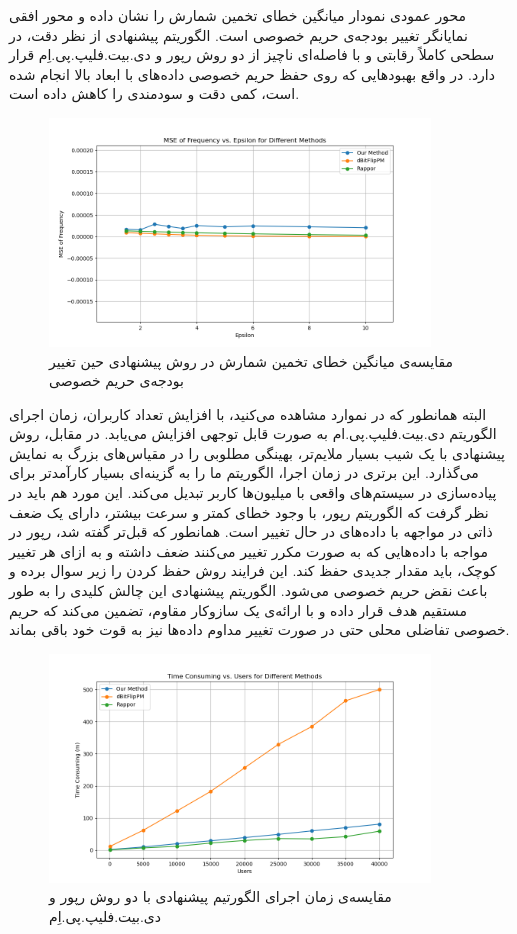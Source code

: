 
محور عمودی نمودار  میانگین خطای تخمین شمارش را نشان داده و محور افقی نمایانگر تغییر بودجه‌ی حریم خصوصی است. الگوریتم پیشنهادی از نظر دقت، در سطحی کاملاً رقابتی و با فاصله‌ای ناچیز از دو روش رپور و دی.بیت.فلیپ.پی.اِم قرار دارد. در واقع بهبودهایی که روی حفظ حریم خصوصی داده‌های با ابعاد بالا انجام شده است، کمی دقت و سودمندی را کاهش داده است.

\begin{figure}[h]
  \centering
  \includegraphics[width=0.9\textwidth]{figs/evaluation_eps_frq.png}
  \caption{مقایسه‌ی میانگین خطای تخمین شمارش در روش پیشنهادی حین تغییر بودجه‌ی حریم خصوصی}
  \label{fig:eps_frq}
\end{figure}

البته همانطور که در نموارد  مشاهده می‌کنید، با افزایش تعداد کاربران، زمان اجرای الگوریتم دی.بیت.فلیپ.پی.ام به صورت قابل توجهی افزایش می‌یابد. در مقابل، روش پیشنهادی با یک شیب بسیار ملایم‌تر، بهینگی مطلوبی را در مقیاس‌های بزرگ به نمایش می‌گذارد. این برتری در زمان اجرا، الگوریتم ما را به گزینه‌ای بسیار کارآمدتر برای پیاده‌سازی در سیستم‌های واقعی با میلیون‌ها کاربر تبدیل می‌کند. این مورد هم باید در نظر گرفت که الگوریتم رپور، با وجود خطای کمتر و سرعت بیشتر، دارای یک ضعف ذاتی در مواجهه با داده‌های در حال تغییر است. همانطور که قبل‌تر گفته شد، رپور در مواجه با داده‌هایی که به صورت مکرر تغییر می‌کنند ضعف داشته و به ازای هر تغییر کوچک، باید مقدار جدیدی حفظ کند. این فرایند روش حفظ کردن را زیر سوال برده و باعث نقض حریم خصوصی می‌شود. الگوریتم پیشنهادی این چالش کلیدی را به طور مستقیم هدف قرار داده و با ارائه‌ی یک سازوکار مقاوم، تضمین می‌کند که حریم خصوصی تفاضلی محلی حتی در صورت تغییر مداوم داده‌ها نیز به قوت خود باقی بماند.

\begin{figure}[h]
  \centering
  \includegraphics[width=0.9\textwidth]{figs/evaluation_usr_tim.png}
  \caption{مقایسه‌ی زمان اجرای الگورتیم پیشنهادی با دو روش رپور و دی.بیت.فلیپ.پی.اِم}
  \label{fig:usr_tim}
\end{figure}



